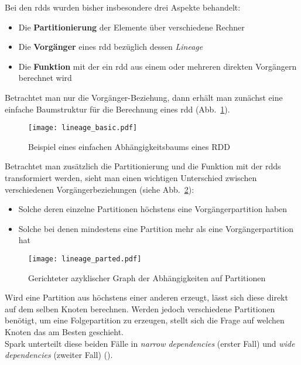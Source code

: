 Bei den \glspl{rdd} wurden bisher insbesondere drei Aspekte behandelt:
\begin{itemize}
	\item Die \textbf{Partitionierung} der Elemente über verschiedene Rechner
	\item Die \textbf{Vorgänger} eines \gls{rdd} bezüglich dessen \textit{Lineage}
	\item Die \textbf{Funktion} mit der ein \gls{rdd} aus einem oder mehreren direkten Vorgängern berechnet wird
\end{itemize}

Betrachtet man nur die Vorgänger-Beziehung, dann erhält man zunächst eine einfache Baumstruktur für die Berechnung eines \gls{rdd} (Abb.~\ref{fig:lineage_basic}).\\

\begin{figure}[ht!]
	\centering
  \texttt{[image: lineage\_basic.pdf]}
	\caption{Beispiel eines einfachen Abhängigkeitsbaums eines RDD}
	\label{fig:lineage_basic}
\end{figure}

Betrachtet man zusätzlich die Partitionierung und die Funktion mit der \glspl{rdd} transformiert werden, sieht man einen wichtigen Unterschied zwischen verschiedenen Vorgängerbeziehungen (siehe Abb.~\ref{fig:lineage_parted}):
\begin{itemize}
\item Solche deren einzelne Partitionen höchstens eine Vorgängerpartition haben
\item Solche bei denen mindestens eine Partition mehr als eine Vorgängerpartition hat
\end{itemize}

\begin{figure}[ht!]
	\centering
  \texttt{[image: lineage\_parted.pdf]}
	\caption{Gerichteter azyklischer Graph der Abhängigkeiten auf Partitionen}
	\label{fig:lineage_parted}
\end{figure}

Wird eine Partition aus höchstens einer anderen erzeugt, lässt sich diese direkt auf dem selben Knoten berechnen. Werden jedoch verschiedene Partitionen benötigt, um eine Folgepartition zu erzeugen, stellt sich die Frage auf welchen Knoten das am Besten geschieht.\\
Spark unterteilt diese beiden Fälle in \textit{narrow dependencies} (erster Fall) und \textit{wide dependencies} (zweiter Fall) (\cite{Mat12}).\\

